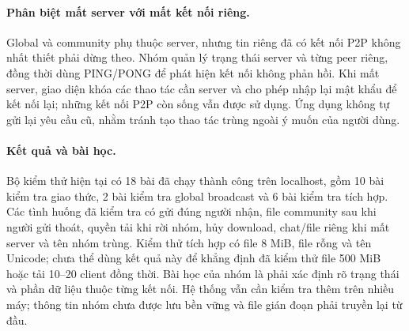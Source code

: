 \paragraph{Phân biệt mất server với mất kết nối riêng.}
Global và community phụ thuộc server, nhưng tin riêng đã có kết nối P2P không
nhất thiết phải dừng theo. Nhóm quản lý trạng thái server và từng peer riêng,
đồng thời dùng PING/PONG để phát hiện kết nối không phản hồi. Khi mất server,
giao diện khóa các thao tác cần server và cho phép nhập lại mật khẩu để kết nối
lại; những kết nối P2P còn sống vẫn được sử dụng. Ứng dụng không tự gửi lại yêu
cầu cũ, nhằm tránh tạo thao tác trùng ngoài ý muốn của người dùng.

\paragraph{Kết quả và bài học.}
Bộ kiểm thử hiện tại có 18 bài đã chạy thành công trên localhost, gồm 10 bài
kiểm tra giao thức, 2 bài kiểm tra global broadcast và 6 bài kiểm tra tích hợp.
Các tình huống đã kiểm tra có gửi đúng người nhận, file community sau khi người
gửi thoát, quyền tải khi rời nhóm, hủy download, chat/file riêng khi mất server
và tên nhóm trùng. Kiểm thử tích hợp có file 8 MiB, file rỗng và tên Unicode;
chưa thể dùng kết quả này để khẳng định đã kiểm thử file 500 MiB hoặc tải 10--20
client đồng thời. Bài học của nhóm là phải xác định rõ trạng thái và phần dữ
liệu thuộc từng kết nối. Hệ thống vẫn cần kiểm tra thêm trên nhiều máy; thông
tin nhóm chưa được lưu bền vững và file gián đoạn phải truyền lại từ đầu.
\par
\endgroup
